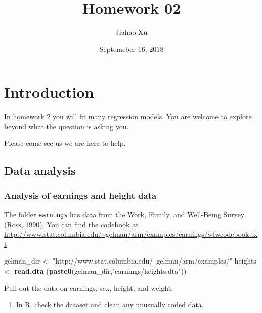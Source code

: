 \documentclass[]{article}
\title{Homework 02}
\author{Jiahao Xu}
\date{Septemeber 16, 2018}
\newenvironment{Shaded}{\begin{snugshade}}{\end{snugshade}}
\newcommand{\KeywordTok}[1]{\textcolor[rgb]{0.13,0.29,0.53}{\textbf{#1}}}
\newcommand{\StringTok}[1]{\textcolor[rgb]{0.31,0.60,0.02}{#1}}
\newcommand{\NormalTok}[1]{#1}
\providecommand{\tightlist}{%
  \setlength{\itemsep}{0pt}\setlength{\parskip}{0pt}}
\begin{document}
\maketitle

\newcommand{\mat}[1]{\boldsymbol{#1}} 
\newcommand{\norm}[1]{\left\lVert#1\right\rVert}
\newcommand{\rv}[1]{\underline{#1}}



\section{Introduction}\label{introduction}

In homework 2 you will fit many regression models. You are welcome to
explore beyond what the question is asking you.

Please come see us we are here to help.

\subsection{Data analysis}\label{data-analysis}

\subsubsection{Analysis of earnings and height
data}\label{analysis-of-earnings-and-height-data}

The folder \texttt{earnings} has data from the Work, Family, and
Well-Being Survey (Ross, 1990). You can find the codebook at
\url{http://www.stat.columbia.edu/~gelman/arm/examples/earnings/wfwcodebook.txt}

\begin{Shaded}
\begin{Highlighting}[]
\NormalTok{gelman_dir <-}\StringTok{ "http://www.stat.columbia.edu/~gelman/arm/examples/"}
\NormalTok{heights    <-}\StringTok{ }\KeywordTok{read.dta}\NormalTok{ (}\KeywordTok{paste0}\NormalTok{(gelman_dir,}\StringTok{"earnings/heights.dta"}\NormalTok{))}
\end{Highlighting}
\end{Shaded}

Pull out the data on earnings, sex, height, and weight.

\begin{enumerate}
\def\labelenumi{\arabic{enumi}.}
\tightlist
\item
  In R, check the dataset and clean any unusually coded data.
\end{enumerate}
\end{document}
